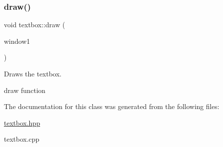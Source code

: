\subsubsection{\texorpdfstring{draw()}{draw()}}
{\footnotesize\ttfamily void textbox\+::draw (\begin{DoxyParamCaption}\item[{sf\+::\+Render\+Window \&}]{window1 }\end{DoxyParamCaption})}



Draws the textbox. 

draw function 

The documentation for this class was generated from the following files\+:\begin{DoxyCompactItemize}
\item 
\hyperlink{textbox_8hpp}{textbox.\+hpp}\item 
textbox.\+cpp\end{DoxyCompactItemize}
